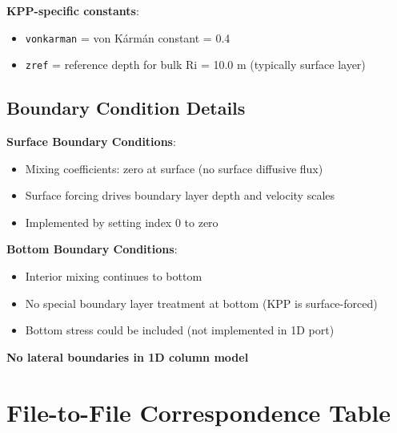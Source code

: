 \documentclass[11pt]{article}
\begin{document}
\textbf{KPP-specific constants}:
\begin{itemize}
    \item \verb|vonkarman| = von Kármán constant = 0.4
    \item \verb|zref| = reference depth for bulk Ri = 10.0 m (typically surface layer)
\end{itemize}

\subsection{Boundary Condition Details}

\textbf{Surface Boundary Conditions}:
\begin{itemize}
    \item Mixing coefficients: zero at surface (no surface diffusive flux)
    \item Surface forcing drives boundary layer depth and velocity scales
    \item Implemented by setting index 0 to zero
\end{itemize}

\textbf{Bottom Boundary Conditions}:
\begin{itemize}
    \item Interior mixing continues to bottom
    \item No special boundary layer treatment at bottom (KPP is surface-forced)
    \item Bottom stress could be included (not implemented in 1D port)
\end{itemize}

\textbf{No lateral boundaries in 1D column model}

\section{File-to-File Correspondence Table}
\label{sec:file_correspondence}
\end{document}

